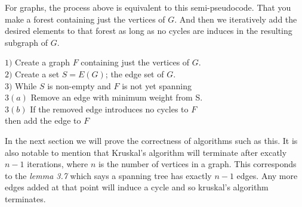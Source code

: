 \documentclass[../main.tex]{subfiles}
\begin{document}
For graphs, the process above is equivalent to this semi-pseudocode. That you make a forest containing just the vertices of $G.$ And then we iteratively add the desired elements to that forest as long as no cycles are induces in the resulting subgraph of $G.$
\begin{algorithm}
$1)$ Create a graph $F$ containing just the vertices of $G.$\\
$2)$ Create a set $S = E(G)$; the edge set of $G.$ \\
$3)$ While $S$ is non-empty and $F$ is not yet spanning\\
\hspace{5mm} $3(a)$ Remove an edge with minimum weight from S.\\
\hspace{5mm} $3(b)$ If the removed edge introduces no cycles to $F$\\
\hspace{5mm} then add the edge to $F$\\
\end{algorithm}

In the next section we will prove the correctness of algorithms such as this. It is also notable to mention that Kruskal's algorithm will terminate after excatly $n-1$ iterations, where $n$ is the number of vertices in a graph. This corresponds to the \textit{lemma 3.7} which says a spanning tree has exactly $n-1$ edges. Any more edges added at that point will induce a cycle and so kruskal's algorithm terminates.
\end{document}
